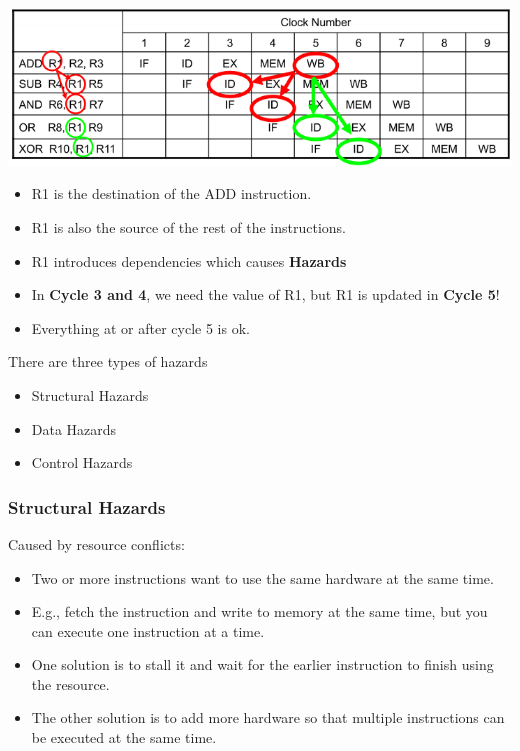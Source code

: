 \documentclass[letterpaper,12pt]{article}
\begin{document}
\includegraphics*[scale = 0.7]{./Image/Pipeline Hazards.png}

\begin{itemize}
    \item R1 is the destination of the ADD instruction.
    \item R1 is also the source of the rest of the instructions.
    \item R1 introduces dependencies which causes \textbf{Hazards}
    \item In \textbf{Cycle 3 and 4}, we need the value of R1, but R1 is updated in \textbf{Cycle 5}!
    \item Everything at or after cycle 5 is ok.
\end{itemize}

There are three types of hazards
\begin{itemize}
    \item Structural Hazards
    \item Data Hazards
    \item Control Hazards
\end{itemize}
\subsubsection{Structural Hazards}
Caused by resource conflicts:
\begin{itemize}
    \item Two or more instructions want to use the same hardware at the same time.
    \item E.g., fetch the instruction and write to memory at the same time, but you can execute one instruction at a time.
    \item One solution is to stall it and wait for the earlier instruction to finish using the resource.
    \item The other solution is to add more hardware so that multiple instructions can be executed at the same time.
\end{itemize}
\end{document}
